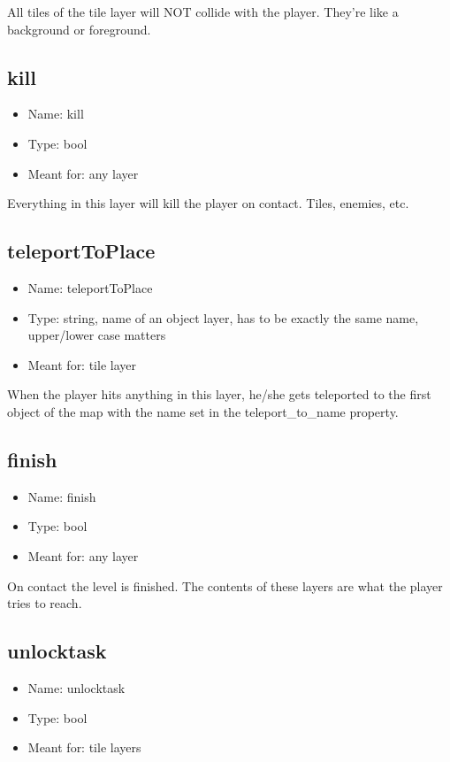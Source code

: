 \documentclass{article}
\begin{document}
All tiles of the tile layer will NOT collide with the player. They're like a background or foreground.

\subsection{kill}
\begin{itemize}
	\item Name: kill
	\item Type: bool
	\item Meant for: any layer
\end{itemize}

Everything in this layer will kill the player on contact. Tiles, enemies, etc.

\subsection{teleportToPlace}
\begin{itemize}
	\item Name: teleportToPlace
	\item Type: string, name of an object layer, has to be exactly the same name, upper/lower case matters
	\item Meant for: tile layer
\end{itemize}

When the player hits anything in this layer, he/she gets teleported to the first object of the map with the name set in the teleport\_to\_name property.

\subsection{finish}
\begin{itemize}
	\item Name: finish
	\item Type: bool
	\item Meant for: any layer
\end{itemize}

On contact the level is finished. The contents of these layers are what the player tries to reach.

\subsection{unlocktask}
\begin{itemize}
	\item Name: unlocktask
	\item Type: bool
	\item Meant for: tile layers
\end{itemize}
\end{document}
